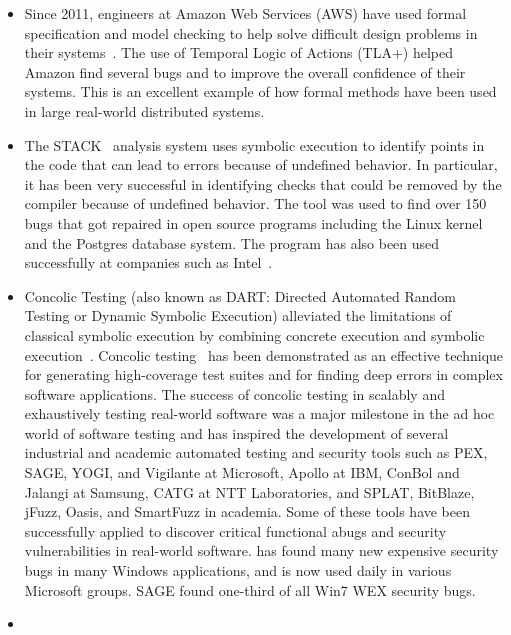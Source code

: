 \begin{itemize}

\item Since 2011, engineers at Amazon Web Services (AWS) have used 
formal specification and model checking to help solve difficult design 
problems in their systems~\cite{CACM2015amazon}. The use of Temporal 
Logic of Actions (TLA+) helped Amazon find several bugs and to improve 
the overall confidence of their systems. This is an excellent example 
of how formal methods have been used in large real-world 
distributed systems.

\item The STACK~\cite{WangZKS13} analysis system uses symbolic execution 
to identify points in the code that can lead to errors because of 
undefined behavior. In particular, it has been very successful in 
identifying checks that could be removed by the compiler because of 
undefined behavior. The tool was used to find over 150 bugs that got 
repaired in open source programs including the Linux kernel 
and the Postgres database system. The program has also been 
used successfully at companies such as Intel~\cite{STACKnews}.

\item Concolic Testing (also known as DART:
Directed Automated Random Testing or Dynamic Symbolic Execution)
alleviated the limitations of classical symbolic execution by
combining concrete execution and symbolic
execution~\cite{PLDI'05,FSE'05}.  Concolic testing~\cite{CACM'13} has been demonstrated as an effective technique for generating
high-coverage test suites and for finding deep errors in complex
software applications. 
The success of concolic testing in scalably and
exhaustively testing real-world software was a major milestone in the
ad hoc world of software testing and has inspired the development of
several industrial and academic automated testing and security tools
such as PEX, SAGE, YOGI, and Vigilante at Microsoft, Apollo at IBM,
ConBol and Jalangi at Samsung, CATG at NTT Laboratories, and SPLAT,
BitBlaze, jFuzz, Oasis, and SmartFuzz in academia. Some of these tools have been successfully applied to discover critical functional abugs and security vulnerabilities in real-world software.   has found many new expensive security bugs in many Windows applications, and is now used daily in various Microsoft groups. SAGE found one-third of all Win7 WEX security bugs.

\item  
{}


\end{itemize}
